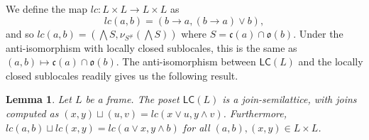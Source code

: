 \documentclass[11pt,a4paper,reqno]{amsart}
\newcommand{\tbigwedge}{\mathop{\textstyle \bigwedge }}%
\def\cl{\mathfrak{c}}
\def\op{\mathfrak{o}}
\newtheorem{lemma}[theorem]{Lemma}
\theoremstyle{definition}
\theoremstyle{remark}
\newcommand{\mf}{\mathsf}
\newcommand{\mi}{\mathit}
\newcommand{\se}{\subseteq}
\newcommand{\we}{\wedge}
\newcommand{\ve}{\vee}
\newcommand{\ra}{\rightarrow}
\begin{document}
{We define the map $\mi{lc}:L\times L\to L\times L$ as 
\[
\mi{lc}(a,b)=(b\ra a,(b\ra a)\vee b),
\]
and so $\mi{lc}(a,b)=(\tbigwedge S,\nu_{S^\#}(\tbigwedge S))$ where $S=\cl(a)\cap \op(b)$. Under the anti-isomorphism with locally closed sublocales, this is the same as $(a,b)\mapsto \cl(a)\cap \op(b)$. The anti-isomorphism between $\mf{LC}(L)$ and the locally closed sublocales readily gives us the following result.
\begin{lemma}\label{l: finite joins in LCL}\label{l: lc does not affect the joins}Let $L$ be a frame.
The poset $\mf{LC}(L)$ is a join-semilattice, with joins computed as $(x,y)\sqcup (u,v)=\mi{lc}(x\ve u,y\we v)$. Furthermore, $\mi{lc}(a,b)\sqcup \mi{lc}(x,y)=\mi{lc}(a\ve x,y\we b)$ for all $(a,b),(x,y)\in L\times L$.
\end{lemma}
}
\end{document}
